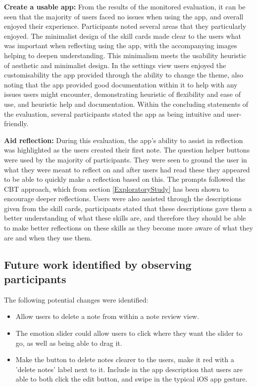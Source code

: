 \documentclass{l4proj}
\begin{document}
\textbf{Create a usable app:} From the results of the monitored evaluation, it can be seen that the majority of users faced no issues when using the app, and overall enjoyed their experience. Participants noted several areas that they particularly enjoyed. The minimalist design of the skill cards made clear to the users what was important when reflecting using the app, with the accompanying images helping to deepen understanding. This minimalism meets the usability heuristic of aesthetic and minimalist design. In the settings view users enjoyed the customisability the app provided through the ability to change the theme, also noting that the app provided good documentation within it to help with any issues users might encounter, demonstrating heuristic of flexibility and ease of use, and heuristic help and documentation. Within the concluding statements of the evaluation, several participants stated the app as being intuitive and user-friendly. 

\textbf{Aid reflection:} During this evaluation, the app's ability to assist in reflection was highlighted as the users created their first note. The question helper buttons were used by the majority of participants. They were seen to ground the user in what they were meant to reflect on and after users had read these they appeared to be able to quickly make a reflection based on this. The prompts followed the CBT approach, which from section \ref{ExploratoryStudy} has been shown to encourage deeper reflections. Users were also assisted through the descriptions given from the skill cards, participants stated that these descriptions gave them a better understanding of what these skills are, and therefore they should be able to make better reflections on these skills as they become more aware of what they are and when they use them.

\subsection{Future work identified by observing participants}

The following potential changes were identified:
\begin{itemize}
    \item Allow users to delete a note from within a note review view.
    \item The emotion slider could allow users to click where they want the slider to go, as well as being able to drag it.
    \item Make the button to delete notes clearer to the users, make it red with a 'delete notes' label next to it. Include in the app description that users are able to both click the edit button, and swipe in the typical iOS app gesture.
\end{itemize}
\end{document}
